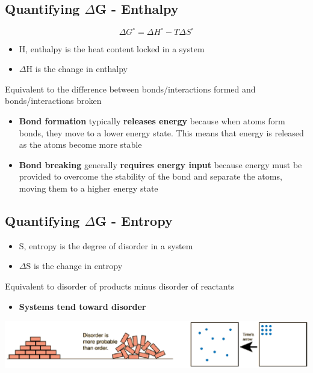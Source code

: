\documentclass[10pt]{article}
\begin{document}
\subsection*{Quantifying $\Delta$G - Enthalpy}
\[\Delta G^\circ = \Delta H^\circ - T\Delta S^\circ\]
\begin{itemize}
    \item H, enthalpy is the heat content locked in a system
    \item $\Delta$H is the change in enthalpy
\end{itemize}
Equivalent to the difference between bonds/interactions formed and bonds/interactions broken
\begin{itemize}
    \item \textbf{Bond formation} typically \textbf{releases energy} because when atoms form bonds, they move to a lower energy state.  This means that energy is released as the atoms become more stable
    \item \textbf{Bond breaking} generally \textbf{requires energy input} because energy must be provided to overcome the stability of the bond and separate the atoms, moving them to a higher energy state
\end{itemize}

\subsection*{Quantifying $\Delta$G - Entropy}
\begin{itemize}
    \item S, entropy is the degree of disorder in a system
    \item $\Delta$S is the change in entropy
\end{itemize}
Equivalent to disorder of products minus disorder of reactants
\begin{itemize}
    \item \textbf{Systems tend toward disorder}
\end{itemize}
\begin{center}
    \includegraphics[width=\textwidth]{L3_13.png}
\end{center}
\end{document}
